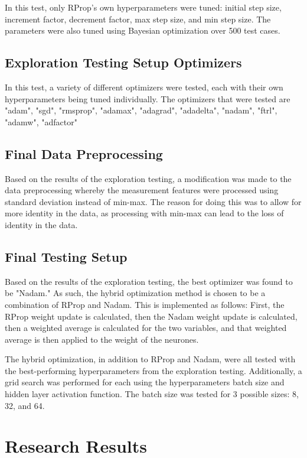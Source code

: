 \documentclass[conference]{IEEEtran}
\begin{document}
In this test, only RProp's own hyperparameters were tuned: initial step size, increment factor, decrement factor, max step size, and min step size. The parameters were also tuned using Bayesian optimization over 500 test cases. 

\subsection{Exploration Testing Setup Optimizers}

In this test, a variety of different optimizers were tested, each with their own hyperparameters being tuned individually. The optimizers that were tested are "adam", "sgd", "rmsprop", "adamax", "adagrad", "adadelta", "nadam", "ftrl", "adamw", "adfactor"

\subsection{Final Data Preprocessing}

Based on the results of the exploration testing, a modification was made to the data preprocessing whereby the measurement features were processed using standard deviation instead of min-max. The reason for doing this was to allow for more identity in the data, as processing with min-max can lead to the loss of identity in the data.

\subsection{Final Testing Setup}

Based on the results of the exploration testing, the best optimizer was found to be "Nadam." As such, the hybrid optimization method is chosen to be a combination of RProp and Nadam. This is implemented as follows: First, the RProp weight update is calculated, then the Nadam weight update is calculated, then a weighted average is calculated for the two variables, and that weighted average is then applied to the weight of the neurones. 

The hybrid optimization, in addition to RProp and Nadam, were all tested with the best-performing hyperparameters from the exploration testing. Additionally, a grid search was performed for each using the hyperparameters batch size and hidden layer activation function. The batch size was tested for 3 possible sizes: 8, 32, and 64. 

\newpage

\section{Research Results }
\end{document}
